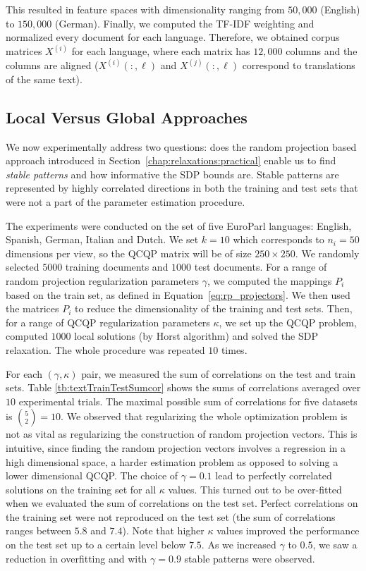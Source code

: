 This resulted in feature spaces with
dimensionality ranging from $50,000$ (English) to $150,000$
(German). Finally, we computed the TF-IDF weighting and normalized
every document for each language. Therefore, we obtained
corpus matrices $X^{(i)}$ for each language, where each
matrix has $12,000$ columns and the columns are aligned
($X^{(i)}\left(:,\ell\right)$ and $X^{(j)}\left(:,\ell\right)$ correspond to
translations of the same text).

\subsection{Local Versus Global Approaches}

We now experimentally address two questions: does the random projection
based approach introduced in Section~\ref{chap:relaxations:practical} enable us to
find \emph{stable patterns} and how informative the SDP
bounds are. Stable patterns are represented by highly correlated directions
in both the training and test sets that were not a part of the parameter
estimation procedure.

The experiments were conducted on the set of five EuroParl
languages: English, Spanish, German, Italian and Dutch. We set
$k = 10$ which corresponds to $n_i = 50$ dimensions per view, so
the QCQP matrix will be of size $250 \times 250$. We randomly
selected $5000$ training documents and $1000$ test documents.  For
a range of random projection regularization parameters $\gamma$,
we computed the mappings $P_i$ based on the train set, as defined in
Equation~\ref{eq:rp_projectors}. We then used the matrices $P_i$ to
reduce the dimensionality of the training and test sets. Then, for
a range of QCQP regularization parameters $\kappa$, we set up the
QCQP problem, computed $1000$ local solutions (by Horst
algorithm) and solved the SDP relaxation. The whole procedure was
repeated $10$ times.

For each $(\gamma, \kappa)$ pair, we measured the sum of
correlations on the test and train sets. Table
\ref{tb:textTrainTestSumcor} shows the sums of correlations
averaged over $10$ experimental trials. The maximal possible sum
of correlations for five datasets is $\binom{5}{2} = 10$.
We observed that regularizing the whole optimization problem is
not as vital as regularizing the construction of random
projection vectors. This is intuitive, since finding the
random projection vectors involves a regression in a high
dimensional space, a harder estimation problem as opposed to
solving a lower dimensional QCQP.
The choice of $\gamma = 0.1$ lead to perfectly correlated
solutions on the training set for all $\kappa$ values. This turned out to
be over-fitted when we evaluated the sum of correlations on the
test set. Perfect correlations on the training set were not reproduced on
the test set (the sum of correlations ranges between $5.8$ and $7.4$).
Note that higher $\kappa$ values improved the
performance on the test set up to a certain level below
$7.5$. As we increased $\gamma$ to $0.5$, we saw a reduction in
overfitting and with $\gamma = 0.9$  stable patterns were observed.

